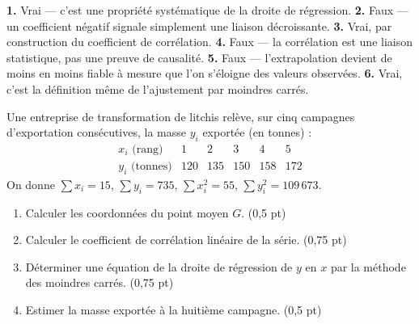 \begin{corrige}[je me teste]
\textbf{1.} Vrai — c'est une propriété systématique de la droite de
régression.
\textbf{2.} Faux — un coefficient négatif signale simplement une liaison
décroissante.
\textbf{3.} Vrai, par construction du coefficient de corrélation.
\textbf{4.} Faux — la corrélation est une liaison statistique, pas une
preuve de causalité.
\textbf{5.} Faux — l'extrapolation devient de moins en moins fiable à mesure
que l'on s'éloigne des valeurs observées.
\textbf{6.} Vrai, c'est la définition même de l'ajustement par moindres
carrés.
\end{corrige}

\begin{commeaubac}
Une entreprise de transformation de litchis relève, sur cinq campagnes
d'exportation consécutives, la masse $y_{i}$ exportée (en tonnes) :
\[
  \begin{array}{c|ccccc}
    x_{i} \text{ (rang)} & 1 & 2 & 3 & 4 & 5 \\
    \hline
    y_{i} \text{ (tonnes)} & 120 & 135 & 150 & 158 & 172
  \end{array}
\]
On donne $\sum x_{i} = 15$, $\sum y_{i} = 735$, $\sum x_{i}^{2} = 55$,
$\sum y_{i}^{2} = 109\,673$.

\begin{enumerate}[label=\textbf{\arabic*.}, leftmargin=*, itemsep=0.25em]
  \item Calculer les coordonnées du point moyen $G$. \hfill\textup{(0,5 pt)}
  \item Calculer le coefficient de corrélation linéaire de la série.
        \hfill\textup{(0,75 pt)}
  \item Déterminer une équation de la droite de régression de $y$ en $x$
        par la méthode des moindres carrés. \hfill\textup{(0,75 pt)}
  \item Estimer la masse exportée à la huitième campagne.
        \hfill\textup{(0,5 pt)}
\end{enumerate}
\end{commeaubac}

